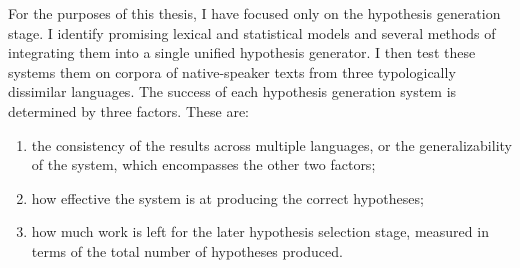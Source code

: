 For the purposes of this thesis, I have focused only on the hypothesis generation stage. I identify promising lexical and statistical models and several methods of integrating them into a single unified hypothesis generator. I then test these systems them on corpora of native-speaker texts from three typologically dissimilar languages. The success of each hypothesis generation system is determined by three factors. These are:
\begin{enumerate}
	\item the consistency of the results across multiple languages, or the generalizability of the system, which encompasses the other two factors;
	\item how effective the system is at producing the correct hypotheses;
	\item how much work is left for the later hypothesis selection stage, measured in terms of the total number of hypotheses produced.
\end{enumerate}